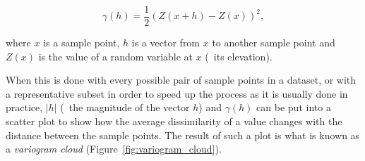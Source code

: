 \begin{equation}
\gamma(h) = \frac{1}{2} (Z(x+h) - Z(x))^2,
\end{equation}

where \(x\) is a sample point, \(h\) is a vector from \(x\) to another sample point and \(Z(x)\) is the value of a random variable at \(x\) (\eg\ its elevation).

When this is done with every possible pair of sample points in a dataset, or with a representative subset in order to speed up the process as it is usually done in practice, \(|h|\) (\ie\ the magnitude of the vector \(h\)) and \(\gamma(h)\) can be put into a scatter plot to show how the average dissimilarity of a value changes with the distance between the sample points.
The result of such a plot is what is known as a \emph{variogram cloud} (Figure~\ref{fig:variogram_cloud}).


